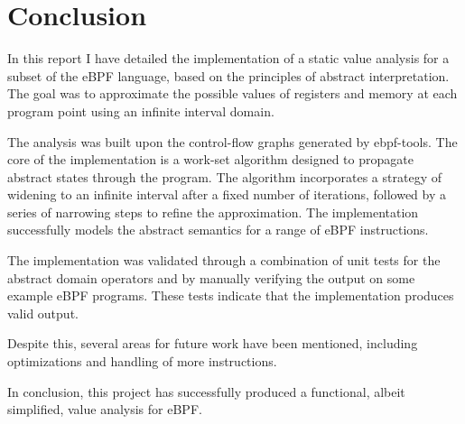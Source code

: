 \section{Conclusion} 
In this report I have detailed the implementation of a static
value analysis for a subset of the eBPF language, based on the principles of
abstract interpretation. The goal was to approximate the possible values of
registers and memory at each program point using an infinite interval domain.

The analysis was built upon the control-flow graphs generated by ebpf-tools.
The core of the implementation is a work-set algorithm designed to propagate
abstract states through the program. The algorithm incorporates a strategy of
widening to an infinite interval after a fixed number of iterations, followed
by a series of narrowing steps to refine the approximation. The implementation
successfully models the abstract semantics for a range of eBPF instructions.

The implementation was validated through a combination of unit tests for the
abstract domain operators and by manually verifying the output on some example
eBPF programs. These tests indicate that the implementation produces valid
output. 

Despite this, several areas for future work have been
mentioned, including optimizations and handling of more instructions. 

In conclusion, this project has successfully produced a functional, albeit
simplified, value analysis for eBPF. 
